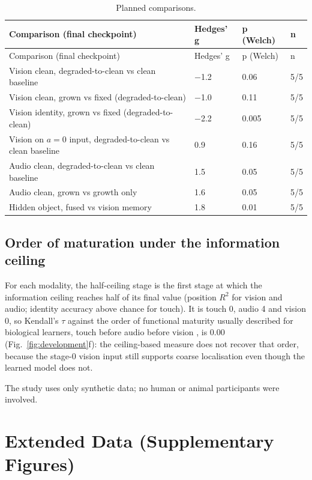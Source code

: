 \documentclass{article}
\theoremstyle{plain}
\theoremstyle{remark}
\begin{document}
\begin{longtable}[]{@{}llll@{}}
\caption{Planned comparisons.}\label{tab:stats}\tabularnewline
\toprule\noalign{}
Comparison (final checkpoint) & Hedges' g & p (Welch) & n \\
\midrule\noalign{}
\endfirsthead
\toprule\noalign{}
Comparison (final checkpoint) & Hedges' g & p (Welch) & n \\
\midrule\noalign{}
\endhead
\bottomrule\noalign{}
\endlastfoot
Vision clean, degraded-to-clean vs clean baseline & \ensuremath{-}1.2 & 0.06 & 5/5 \\
Vision clean, grown vs fixed (degraded-to-clean) & \ensuremath{-}1.0 & 0.11 & 5/5 \\
Vision identity, grown vs fixed (degraded-to-clean) & \ensuremath{-}2.2 & 0.005 & 5/5 \\
Vision on \(a=0\) input, degraded-to-clean vs clean baseline & 0.9 & 0.16 & 5/5 \\
Audio clean, degraded-to-clean vs clean baseline & 1.5 & 0.05 & 5/5 \\
Audio clean, grown vs growth only & 1.6 & 0.05 & 5/5 \\
Hidden object, fused vs vision memory & 1.8 & 0.01 & 5/5 \\
\end{longtable}

\subsection{Order of maturation under the information ceiling}
\label{app:milestones}

For each modality, the half-ceiling stage is the first stage at which the information ceiling reaches half of its final value (position \(R^2\) for vision and audio; identity accuracy above chance for touch). It is touch 0, audio 4 and vision 0, so Kendall's \ensuremath{\tau} against the order of functional maturity usually described for biological learners, touch before audio before vision \autocite{turkewitz1982limitations}, is 0.00 (Fig.~\ref{fig:development}f): the ceiling-based measure does not recover that order, because the stage-0 vision input still supports coarse localisation even though the learned model does not.

The study uses only synthetic data; no human or animal participants were involved.

\clearpage
\section*{Extended Data (Supplementary Figures)}
\setcounter{figure}{0}
\renewcommand{\thefigure}{S\arabic{figure}}
\end{document}
